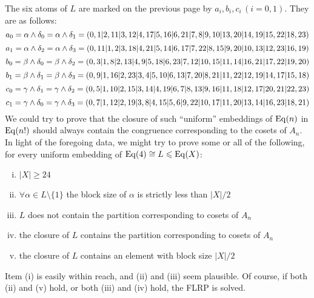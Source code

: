 The six atoms of $L$ are marked on the previous page by $a_i, b_i, c_i \, (i=0,1)$.  They are as follows:
{\scriptsize
\[
a_0 = \alpha \wedge \delta_0 = \alpha\wedge \delta_1 = (0,1|2,11|3,12|4,17|5,16|6,21|7,8|9,10|13,20|14,19|15,22|18,23)
\]
\[
a_1 = \alpha \wedge \delta_2 = \alpha\wedge \delta_3 = (0,11|1,2|3,18|4,21|5,14|6,17|7,22|8,15|9,20|10,13|12,23|16,19)
\]
\[
b_0 = \beta \wedge \delta_0 = \beta \wedge \delta_2 = (0,3|1,8|2,13|4,9|5,18|6,23|7,12|10,15|11,14|16,21|17,22|19,20)
\]
\[
b_1 =\beta \wedge \delta_1 = \beta\wedge \delta_3 = (0,9|1,16|2,23|3,4|5,10|6,13|7,20|8,21|11,22|12,19|14,17|15,18)
\]
\[
c_0 =\gamma \wedge \delta_1 = \gamma \wedge \delta_2 = (0,5|1,10|2,15|3,14|4,19|6,7|8,13|9,16|11,18|12,17|20,21|22,23)
\]
\[
c_1 =\gamma \wedge \delta_0 = \gamma \wedge \delta_3 = (0,7|1,12|2,19|3,8|4,15|5,6|9,22|10,17|11,20|13,14|16,23|18,21)
\]
}
We could try to prove that the closure of such
``uniform'' embeddings of $\operatorname{Eq}(n)$ in $\operatorname{Eq}(n!)$ should always contain the congruence 
corresponding to the cosets of $A_n$. 
In light of the foregoing data, we might try to prove some or all of the
following, for every uniform embedding of $\operatorname{Eq}(4)\cong L \leqslant \operatorname{Eq}(X)$:
\begin{enumerate}[(i)]
\item $|X|\geq 24$
\item $\forall \alpha \in L \setminus \{1\}$ the block size of $\alpha$ is strictly
  less than $|X|/2$
\item $L$ does not contain the partition corresponding to cosets of $A_n$
\item the closure of $L$ contains the partition corresponding to cosets of $A_n$
\item the closure of $L$ contains an element with block size $|X|/2$
\end{enumerate}
Item (i) is easily within reach, and (ii) and (iii) seem plausible. 
Of course, %
if both (ii) and (v) hold, or both (iii) and (iv) hold, the FLRP is solved.

